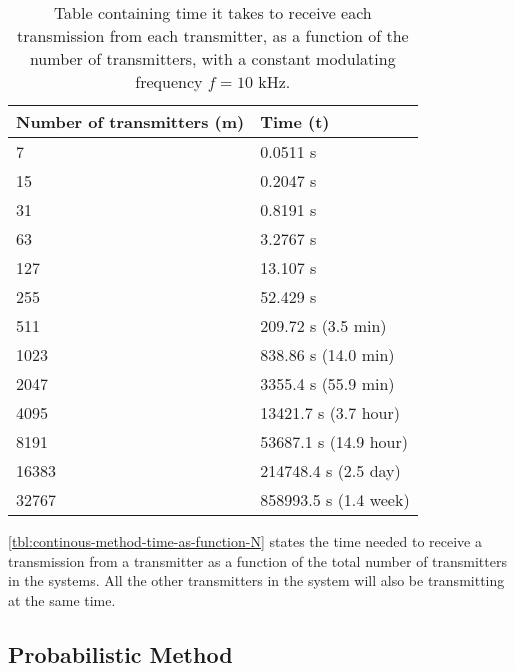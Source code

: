 \begin{table}[t]
	\centering
	\begin{tabular}{  | l | l | }

	\hline
	Number of transmitters (m)	& Time (t)					\\ \hline


	7							& 0.0511 s					\\ \hline 
	15							& 0.2047 s					\\ \hline
	31							& 0.8191 s					\\ \hline
	63							& 3.2767 s					\\ \hline
	127							& 13.107 s					\\ \hline
	255							& 52.429 s					\\ \hline
	511							& 209.72 s (3.5 min)		\\ \hline
	1023						& 838.86 s (14.0 min)		\\ \hline
	2047						& 3355.4 s (55.9 min)		\\ \hline
	4095						& 13421.7 s (3.7 hour)		\\ \hline
	8191						& 53687.1 s (14.9 hour)		\\ \hline
	16383						& 214748.4 s (2.5 day)		\\ \hline
	32767						& 858993.5 s (1.4 week)		\\ \hline



\end{tabular}
	\caption{Table containing time it takes to receive each transmission from each transmitter, as a function of the number of transmitters, with a constant modulating frequency $f = 10$ kHz.}
	\label{tbl:continous-method-time-as-function-N}
\end{table}

\autoref{tbl:continous-method-time-as-function-N} states the time needed to receive a transmission from a transmitter as a function of the total number of transmitters in the systems. 
All the other transmitters in the system will also be transmitting at the same time.





\subsection{Probabilistic Method}
\label{subsec:probabilistic-method-modulation}



